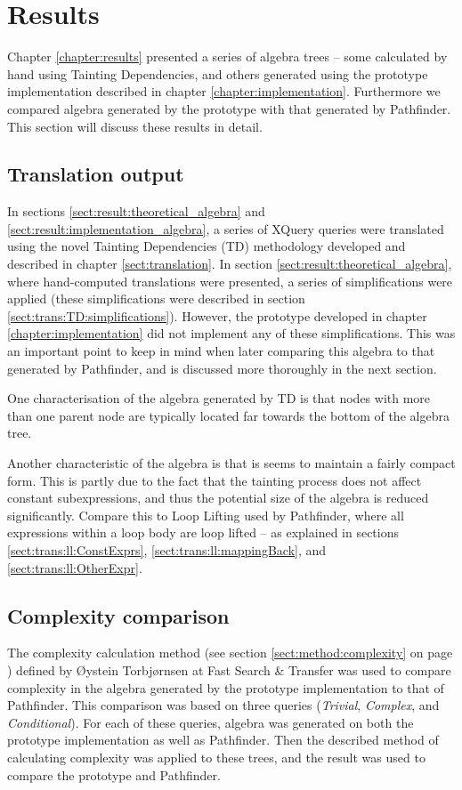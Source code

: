 \section{Results}
\label{sect:disc:res}
Chapter \ref{chapter:results} presented a series of algebra trees --
some calculated by hand using Tainting Dependencies, and others generated using
the prototype implementation described in chapter \ref{chapter:implementation}.
Furthermore we compared algebra generated by the prototype with that generated
by Pathfinder. This section will discuss these results in detail.

\subsection{Translation output}
\label{sect:disc:res:translation_output}
In sections \ref{sect:result:theoretical_algebra} and
\ref{sect:result:implementation_algebra}, a series of XQuery queries were
translated using the novel Tainting Dependencies (TD) methodology developed
and described in chapter \ref{sect:translation}. In section
\ref{sect:result:theoretical_algebra}, where hand-computed translations were
presented, a series of simplifications were applied (these simplifications were
described in section \ref{sect:trans:TD:simplifications}). However, the
prototype developed in chapter \ref{chapter:implementation} did not implement
any of these simplifications. This was an important point to keep in mind when
later comparing this algebra to that generated by Pathfinder, and is
discussed more thoroughly in the next section.

One characterisation of the algebra generated by TD is that nodes with more
than one parent node are typically located far towards the bottom of the algebra
tree. 

Another characteristic of the algebra is that is seems to maintain a fairly
compact form. This is partly due to the fact that the tainting process does not
affect constant subexpressions, and thus the potential size of the algebra is
reduced significantly. Compare this to Loop Lifting used by
Pathfinder, where all expressions within a loop body are loop lifted --
as explained in sections \ref{sect:trans:ll:ConstExprs},
\ref{sect:trans:ll:mappingBack}, and \ref{sect:trans:ll:OtherExpr}.

\subsection{Complexity comparison}
\label{sect:disc:res:comparison}
The complexity calculation method (see section \ref{sect:method:complexity} on
page \pageref{sect:method:complexity}) defined by \O ystein Torbj\o rnsen at
Fast Search \& Transfer was used to compare complexity in the algebra generated
by the prototype implementation to that of Pathfinder. This comparison was
based on three queries (\emph{Trivial}, \emph{Complex}, and
\emph{Conditional}). For each of these queries, algebra was generated on both
the prototype implementation as well as Pathfinder. Then the described
method of calculating complexity was applied to these trees, and the result was
used to compare the prototype and Pathfinder.

